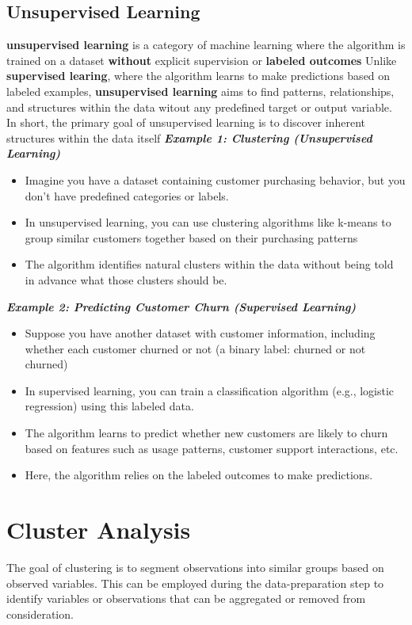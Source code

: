 \documentclass{report}
\begin{document}
\subsection{Unsupervised Learning}
\textbf{unsupervised learning} is a category of machine learning where the algorithm is trained on a dataset \textbf{without} explicit supervision or \textbf{labeled outcomes}
\bigbreak \noindent
Unlike \textbf{supervised learing}, where the algorithm learns to make predictions based on labeled examples, \textbf{unsupervised learning} aims to find patterns, relationships, and structures within the data witout any predefined target or output variable.
\bigbreak \noindent
In short, the primary goal of unsupervised learning is to discover inherent structures within the data itself
\bigbreak \noindent
\textit{\textbf{Example 1: Clustering (Unsupervised Learning)}}
\begin{itemize}
  \item Imagine you have a dataset containing customer purchasing behavior, but you don't have predefined categories or labels. 
  \item In unsupervised learning, you can use clustering algorithms like k-means to group similar customers together based on their purchasing patterns
  \item The algorithm identifies natural clusters within the data without being told in advance what those clusters should be.
\end{itemize}
\bigbreak \noindent
\textit{\textbf{Example 2: Predicting Customer Churn (Supervised Learning)}}
\begin{itemize}
  \item Suppose you have another dataset with customer information, including whether each customer churned or not (a binary label: churned or not churned) 
  \item In supervised learning, you can train a classification algorithm (e.g., logistic regression) using this labeled data.
  \item The algorithm learns to predict whether new customers are likely to churn based on features such as usage patterns, customer support interactions, etc.
  \item Here, the algorithm relies on the labeled outcomes to make predictions.
\end{itemize}
\newpage
\section{Cluster Analysis}
The goal of clustering is to segment observations into similar groups based on observed variables.
\bigbreak \noindent
This can be employed during the data-preparation step to identify variables or observations that can be aggregated or removed from consideration.
\vspace{2mm}
\end{document}
